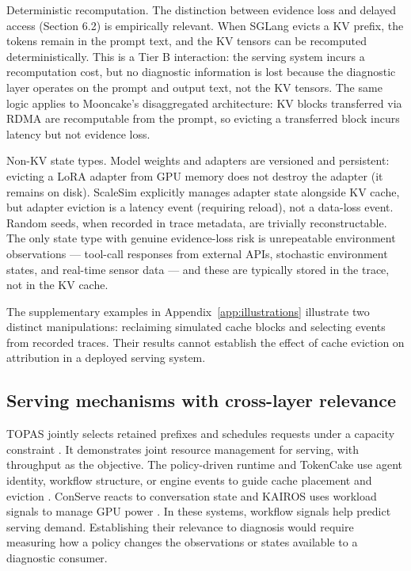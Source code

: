 \documentclass[preprint,12pt]{elsarticle}
\begin{document}
Deterministic recomputation. The distinction between evidence loss and delayed access (Section 6.2) is empirically relevant. When SGLang evicts a KV prefix, the tokens remain in the prompt text, and the KV tensors can be recomputed deterministically. This is a Tier B interaction: the serving system incurs a recomputation cost, but no diagnostic information is lost because the diagnostic layer operates on the prompt and output text, not the KV tensors. The same logic applies to Mooncake's disaggregated architecture: KV blocks transferred via RDMA are recomputable from the prompt, so evicting a transferred block incurs latency but not evidence loss.


Non-KV state types. Model weights and adapters are versioned and persistent: evicting a LoRA adapter from GPU memory does not destroy the adapter (it remains on disk). ScaleSim explicitly manages adapter state alongside KV cache, but adapter eviction is a latency event (requiring reload), not a data-loss event. Random seeds, when recorded in trace metadata, are trivially reconstructable. The only state type with genuine evidence-loss risk is unrepeatable environment observations --- tool-call responses from external APIs, stochastic environment states, and real-time sensor data --- and these are typically stored in the trace, not in the KV cache.


The supplementary examples in Appendix~\ref{app:illustrations} illustrate two distinct manipulations: reclaiming simulated cache blocks and selecting events from recorded traces. Their results cannot establish the effect of cache eviction on attribution in a deployed serving system.

\subsection{Serving mechanisms with cross-layer relevance}
TOPAS jointly selects retained prefixes and schedules requests under a capacity constraint \cite{v5ref24}. It demonstrates joint resource management for serving, with throughput as the objective. The policy-driven runtime and TokenCake use agent identity, workflow structure, or engine events to guide cache placement and eviction \cite{v5ref47,v5ref4}. ConServe reacts to conversation state and KAIROS uses workload signals to manage GPU power \cite{v5supp6,v5ref44}. In these systems, workflow signals help predict serving demand. Establishing their relevance to diagnosis would require measuring how a policy changes the observations or states available to a diagnostic consumer.
\end{document}
